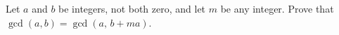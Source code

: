 Let $a$ and $b$ be integers, not both zero, and let $m$ be any integer. Prove that $\gcd(a,b)=\gcd(a,\,b+ma)$.
